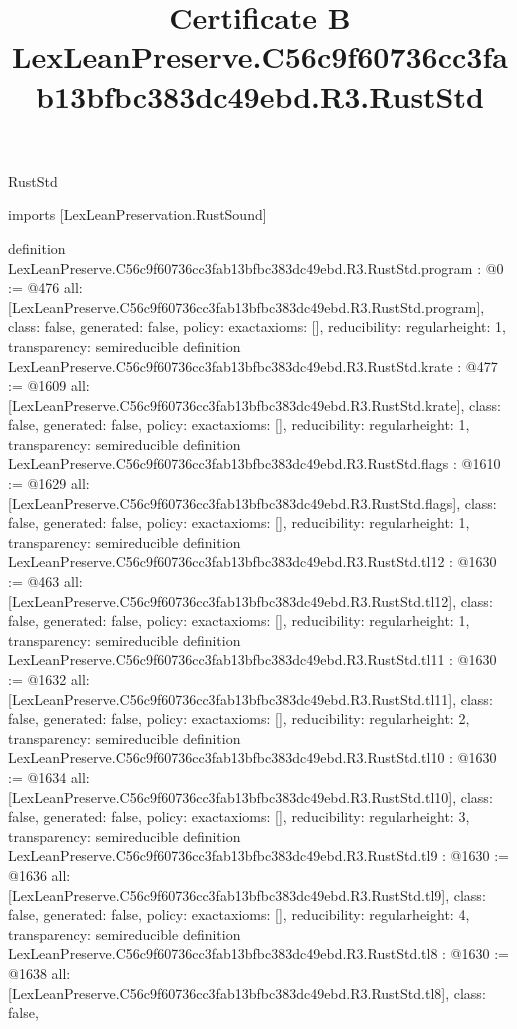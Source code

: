 \begin{lexlean}{RustStd}
\title{Certificate B LexLeanPreserve.C56c9f60736cc3fab13bfbc383dc49ebd.R3.RustStd}
\begin{coremodule}
imports [LexLeanPreservation.RustSound]

definition LexLeanPreserve.C56c9f60736cc3fab13bfbc383dc49ebd.R3.RustStd.program : @0 := @476 {
  all: [LexLeanPreserve.C56c9f60736cc3fab13bfbc383dc49ebd.R3.RustStd.program],
  class: false,
  generated: false,
  policy: exact{axioms: []},
  reducibility: regular{height: 1},
  transparency: semireducible
}
definition LexLeanPreserve.C56c9f60736cc3fab13bfbc383dc49ebd.R3.RustStd.krate : @477 := @1609 {
  all: [LexLeanPreserve.C56c9f60736cc3fab13bfbc383dc49ebd.R3.RustStd.krate],
  class: false,
  generated: false,
  policy: exact{axioms: []},
  reducibility: regular{height: 1},
  transparency: semireducible
}
definition LexLeanPreserve.C56c9f60736cc3fab13bfbc383dc49ebd.R3.RustStd.flags : @1610 := @1629 {
  all: [LexLeanPreserve.C56c9f60736cc3fab13bfbc383dc49ebd.R3.RustStd.flags],
  class: false,
  generated: false,
  policy: exact{axioms: []},
  reducibility: regular{height: 1},
  transparency: semireducible
}
definition LexLeanPreserve.C56c9f60736cc3fab13bfbc383dc49ebd.R3.RustStd.tl12 : @1630 := @463 {
  all: [LexLeanPreserve.C56c9f60736cc3fab13bfbc383dc49ebd.R3.RustStd.tl12],
  class: false,
  generated: false,
  policy: exact{axioms: []},
  reducibility: regular{height: 1},
  transparency: semireducible
}
definition LexLeanPreserve.C56c9f60736cc3fab13bfbc383dc49ebd.R3.RustStd.tl11 : @1630 := @1632 {
  all: [LexLeanPreserve.C56c9f60736cc3fab13bfbc383dc49ebd.R3.RustStd.tl11],
  class: false,
  generated: false,
  policy: exact{axioms: []},
  reducibility: regular{height: 2},
  transparency: semireducible
}
definition LexLeanPreserve.C56c9f60736cc3fab13bfbc383dc49ebd.R3.RustStd.tl10 : @1630 := @1634 {
  all: [LexLeanPreserve.C56c9f60736cc3fab13bfbc383dc49ebd.R3.RustStd.tl10],
  class: false,
  generated: false,
  policy: exact{axioms: []},
  reducibility: regular{height: 3},
  transparency: semireducible
}
definition LexLeanPreserve.C56c9f60736cc3fab13bfbc383dc49ebd.R3.RustStd.tl9 : @1630 := @1636 {
  all: [LexLeanPreserve.C56c9f60736cc3fab13bfbc383dc49ebd.R3.RustStd.tl9],
  class: false,
  generated: false,
  policy: exact{axioms: []},
  reducibility: regular{height: 4},
  transparency: semireducible
}
definition LexLeanPreserve.C56c9f60736cc3fab13bfbc383dc49ebd.R3.RustStd.tl8 : @1630 := @1638 {
  all: [LexLeanPreserve.C56c9f60736cc3fab13bfbc383dc49ebd.R3.RustStd.tl8],
  class: false,
}
\end{coremodule}
\end{lexlean}
